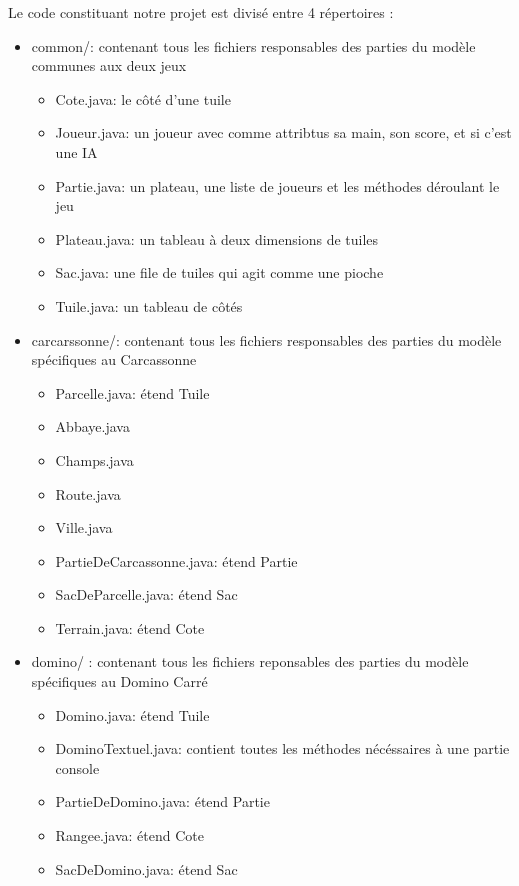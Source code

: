 \documentclass{article}
\begin{document}
Le code constituant notre projet est divisé entre 4 répertoires :
\begin{itemize}
    \item common/: contenant tous les fichiers responsables des parties du modèle communes aux deux jeux
    \begin{itemize}
        \item Cote.java: le côté d'une tuile
        \item Joueur.java: un joueur avec comme attribtus sa main, son score, et si c'est une IA
        \item Partie.java: un plateau, une liste de joueurs et les méthodes déroulant le jeu
        \item Plateau.java: un tableau à deux dimensions de tuiles
        \item Sac.java: une file de tuiles qui agit comme une pioche
        \item Tuile.java: un tableau de côtés
    \end{itemize}    
    \item carcarssonne/: contenant tous les fichiers responsables des parties du modèle spécifiques au Carcassonne
    \begin{itemize}        
        \item Parcelle.java: étend Tuile
        \item Abbaye.java
        \item Champs.java
        \item Route.java
        \item Ville.java
        \item PartieDeCarcassonne.java: étend Partie
        \item SacDeParcelle.java: étend Sac
        \item Terrain.java: étend Cote
    \end{itemize}
    \item domino/ : contenant tous les fichiers reponsables des parties du modèle spécifiques au Domino Carré
    \begin{itemize}
        \item Domino.java: étend Tuile
        \item DominoTextuel.java: contient toutes les méthodes nécéssaires à une partie console
        \item PartieDeDomino.java: étend Partie
        \item Rangee.java: étend Cote
        \item SacDeDomino.java: étend Sac
    \end{itemize}

\end{itemize}
\end{document}

